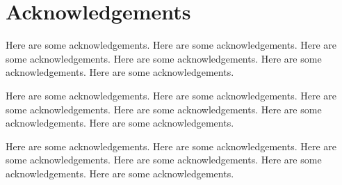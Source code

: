 \chapter*{Acknowledgements}

Here are some acknowledgements. Here are some acknowledgements. Here are some acknowledgements. Here are some acknowledgements. Here are some acknowledgements. Here are some acknowledgements.

Here are some acknowledgements. Here are some acknowledgements. Here are some acknowledgements. Here are some acknowledgements. Here are some acknowledgements. Here are some acknowledgements.

Here are some acknowledgements. Here are some acknowledgements. Here are some acknowledgements. Here are some acknowledgements. Here are some acknowledgements. Here are some acknowledgements.

